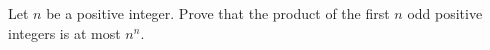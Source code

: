 Let $n$ be a positive integer. Prove that the product of the first $n$ odd positive integers is at most $n^n$.
